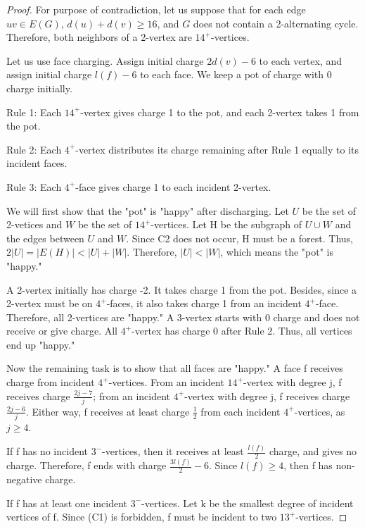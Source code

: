 \documentclass[a4paper, 11pt]{article} %
\begin{document}
\begin{proof}
\cite{cranston2013guide} For purpose of contradiction, let us suppose that for each edge $uv \in E(G)$, $d(u) + d(v) \geq 16$, and $G$ does not contain a 2-alternating cycle. Therefore, both neighbors of a 2-vertex are $14^{+}$-vertices. 

Let us use face charging. Assign initial charge $2d(v) - 6$ to each vertex, and assign initial charge $l(f) - 6$ to each face. We keep a pot of charge with 0 charge initially. 

Rule 1: Each $14^{+}$-vertex gives charge 1 to the pot, and each 2-vertex takes 1 from the pot. 

Rule 2: Each $4^{+}$-vertex distributes its charge remaining after Rule 1 equally to its incident faces. 

Rule 3: Each $4^{+}$-face gives charge 1 to each incident 2-vertex. 

We will first show that the "pot" is "happy" after discharging. Let $U$ be the set of 2-vetices and $W$ be the set of $14^{+}$-vertices. Let H be the subgraph of $U \cup W$ and the edges between $U$ and $W$. Since C2 does not occur, H must be a forest. Thus, $2|U| = |E(H)| < |U| + |W|$. Therefore, $|U|<|W|$, which means the "pot" is "happy."

A 2-vertex initially has charge -2. It takes charge 1 from the pot. Besides, since a 2-vertex must be on $4^{+}$-faces, it also takes charge 1 from an incident $4^{+}$-face. Therefore, all 2-vertices are "happy." A 3-vertex starts with 0 charge and does not receive or give charge. All $4^{+}$-vertex has charge 0 after Rule 2. Thus, all vertices end up "happy." 

Now the remaining task is to show that all faces are "happy." A face f receives charge from incident $4^{+}$-vertices. From an incident $14^{+}$-vertex with degree j, f receives charge $\frac{2j - 7}{j}$; from an incident $4^{+}$-vertex with degree j, f receives charge $\frac{2j - 6}{j}$. Either way, f receives at least charge $\frac{1}{2}$ from each incident $4^{+}$-vertices, as $j \geq 4$.

If f has no incident $3^{-}$-vertices, then it receives at least $\frac{l(f)}{2}$ charge, and gives no charge. Therefore, f ends with charge $\frac{3l(f)}{2}-6$. Since $l(f) \geq 4$, then f has non-negative charge. 

If f has at least one incident $3^{-}$-vertices. Let k be the smallest degree of incident vertices of f. Since (C1) is forbidden, f must be incident to two $13^{+}$-vertices.


\end{proof}
\end{document}
